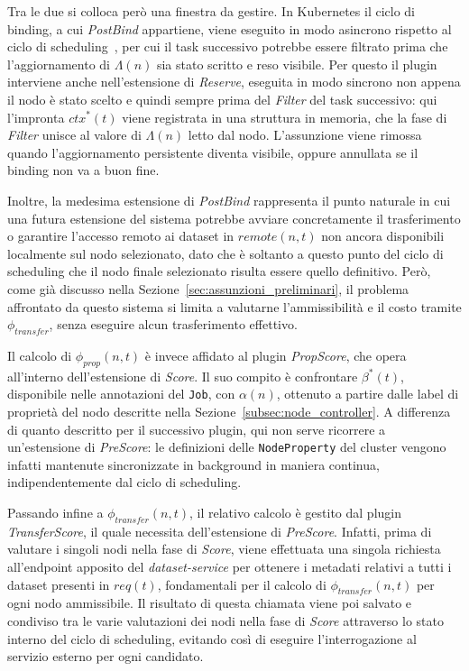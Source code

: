 Tra le due si colloca però una finestra da gestire. In Kubernetes il ciclo di binding, a cui \emph{PostBind} appartiene, viene eseguito in modo asincrono rispetto al ciclo di scheduling~\cite{k8s-scheduler-framework}, per cui il task successivo potrebbe essere filtrato prima che l'aggiornamento di $\Lambda(n)$ sia stato scritto e reso visibile. Per questo il plugin interviene anche nell'estensione di \emph{Reserve}, eseguita in modo sincrono non appena il nodo è stato scelto e quindi sempre prima del \emph{Filter} del task successivo: qui l'impronta $ctx^*(t)$ viene registrata in una struttura in memoria, che la fase di \emph{Filter} unisce al valore di $\Lambda(n)$ letto dal nodo. L'assunzione viene rimossa quando l'aggiornamento persistente diventa visibile, oppure annullata se il binding non va a buon fine.

Inoltre, la medesima estensione di \emph{PostBind} rappresenta il punto naturale in cui una futura estensione del sistema potrebbe avviare concretamente il trasferimento o garantire l'accesso remoto ai dataset in $remote(n,t)$ non ancora disponibili localmente sul nodo selezionato, dato che è soltanto a questo punto del ciclo di scheduling che il nodo finale selezionato risulta essere quello definitivo. Però, come già discusso nella Sezione~\ref{sec:assunzioni_preliminari}, il problema affrontato da questo sistema si limita a valutarne l'ammissibilità e il costo tramite $\phi_{transfer}$, senza eseguire alcun trasferimento effettivo.

Il calcolo di $\phi_{prop}(n,t)$ è invece affidato al plugin \emph{PropScore}, che opera all'interno dell'estensione di \emph{Score}. Il suo compito è confrontare $\beta^*(t)$, disponibile nelle annotazioni del \texttt{Job}, con $\alpha(n)$, ottenuto a partire dalle label di proprietà del nodo descritte nella Sezione~\ref{subsec:node_controller}. A differenza di quanto descritto per il successivo plugin, qui non serve ricorrere a un'estensione di \emph{PreScore}: le definizioni delle \texttt{NodeProperty} del cluster vengono infatti mantenute sincronizzate in background in maniera continua, indipendentemente dal ciclo di scheduling.

Passando infine a $\phi_{transfer}(n,t)$, il relativo calcolo è gestito dal plugin \emph{TransferScore}, il quale necessita dell'estensione di \emph{PreScore}. Infatti, prima di valutare i singoli nodi nella fase di \emph{Score}, viene effettuata una singola richiesta all'endpoint apposito del \emph{dataset-service} per ottenere i metadati relativi a tutti i dataset presenti in $req(t)$, fondamentali per il calcolo di $\phi_{transfer}(n,t)$ per ogni nodo ammissibile. Il risultato di questa chiamata viene poi salvato e condiviso tra le varie valutazioni dei nodi nella fase di \emph{Score} attraverso lo stato interno del ciclo di scheduling, evitando così di eseguire l'interrogazione al servizio esterno per ogni candidato.

